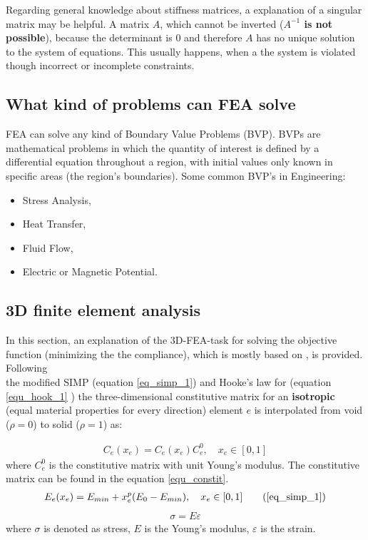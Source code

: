 Regarding general knowledge about stiffness matrices, a explanation of a singular matrix may be helpful.
A matrix $A$, which cannot be inverted
(\textbf{$A^{-1} $ is not possible}), because
the determinant is $0$ and therefore \textbf{$A$} has no unique solution to the system of equations. This usually happens, when a the system is violated though incorrect or incomplete constraints.

\subsection{What kind of problems can FEA solve}
FEA can solve any kind of Boundary Value Problems (BVP). BVPs are mathematical problems in which the quantity of interest is defined by a differential equation throughout a region, with initial values only known in specific areas (the region's boundaries). Some common BVP's in Engineering:
\begin{itemize}
\item{Stress Analysis},
\item{ Heat Transfer},
\item{ Fluid Flow}, 
\item {Electric or Magnetic Potential.}
\end{itemize}
 
 \subsection{3D finite element analysis}
 In this section, an explanation of the 3D-FEA-task for solving the objective function (minimizing the the compliance), which is mostly based on \cite{Liu.2014}, is provided. Following \\
 the modified SIMP (equation \ref{eq_simp_1}) and Hooke's law for (equation \ref{equ_hook_1} ) the three-dimensional constitutive matrix for an \textbf{isotropic} (equal material properties for every direction) element \textbf{$e$} is interpolated from void ($\rho = 0$) to solid ($\rho = 1$) as:
 
 \begin{align} 
 C_e(x_e) = C _e(x_e)C_e^0 ,\quad x_e \in [0,1]
\end{align} 
where \textbf{$C_e^0$} is the constitutive matrix with unit Young's modulus.
The constitutive matrix can be found in the equation \eqref{equ_constit}.
 \begin{align} 
 E_e(x_e) = E_{min}+ x_e^p (E_0-E_{min}), \quad x_e \in [0,1]
 \tag{\ref{eq_simp_1}} 
\end{align}
\begin{align} 
\sigma = E \varepsilon
\label{equ_hook_1}
\end{align}
where \textbf{$\sigma$} is denoted as stress, \textbf{$E$} is the Young's modulus, \textbf{$\varepsilon$} is the strain.\\

